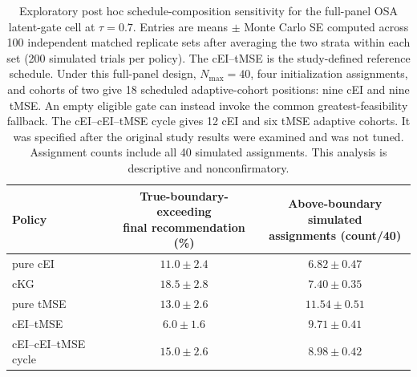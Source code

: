 \begin{table}[H]
\centering\small
\begin{tabular}{@{}lcc@{}}
\toprule
Policy & \shortstack{True-boundary-exceeding\\final recommendation (\%)} & \shortstack{Above-boundary simulated\\assignments (count/40)} \\
\midrule
pure cEI & $11.0{\pm}2.4$ & $6.82{\pm}0.47$ \\
cKG & $18.5{\pm}2.8$ & $7.40{\pm}0.35$ \\
pure tMSE & $13.0{\pm}2.6$ & $11.54{\pm}0.51$ \\
cEI--tMSE & $6.0{\pm}1.6$ & $9.71{\pm}0.41$ \\
cEI--cEI--tMSE cycle & $15.0{\pm}2.6$ & $8.98{\pm}0.42$ \\
\bottomrule
\end{tabular}
\caption{Exploratory post hoc schedule-composition sensitivity for the full-panel OSA latent-gate cell at $\tau=0.7$. Entries are means $\pm$ Monte Carlo SE computed across 100 independent matched replicate sets after averaging the two strata within each set (200 simulated trials per policy). The cEI--tMSE is the study-defined reference schedule. Under this full-panel design, $N_{\max}=40$, four initialization assignments, and cohorts of two give 18 scheduled adaptive-cohort positions: nine cEI and nine tMSE. An empty eligible gate can instead invoke the common greatest-feasibility fallback. The cEI--cEI--tMSE cycle gives 12 cEI and six tMSE adaptive cohorts. It was specified after the original study results were examined and was not tuned. Assignment counts include all 40 simulated assignments. This analysis is descriptive and nonconfirmatory.}
\label{tab:schedule_ratio_posthoc}
\end{table}
